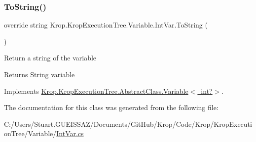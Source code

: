 \subsubsection{\texorpdfstring{To\+String()}{ToString()}}
{\footnotesize\ttfamily override string Krop.\+Krop\+Execution\+Tree.\+Variable.\+Int\+Var.\+To\+String (\begin{DoxyParamCaption}{ }\end{DoxyParamCaption})\hspace{0.3cm}{\ttfamily [virtual]}}



Return a string of the variable 

\begin{DoxyReturn}{Returns}
String variable
\end{DoxyReturn}


Implements \mbox{\hyperlink{class_krop_1_1_krop_execution_tree_1_1_abstract_class_1_1_variable_ae78ccbb029efb966e1edff0ae101f367}{Krop.\+Krop\+Execution\+Tree.\+Abstract\+Class.\+Variable$<$ int?$>$}}.



The documentation for this class was generated from the following file\+:\begin{DoxyCompactItemize}
\item 
C\+:/\+Users/\+Stuart.\+G\+U\+E\+I\+S\+S\+A\+Z/\+Documents/\+Git\+Hub/\+Krop/\+Code/\+Krop/\+Krop\+Execution\+Tree/\+Variable/\mbox{\hyperlink{_int_var_8cs}{Int\+Var.\+cs}}\end{DoxyCompactItemize}
